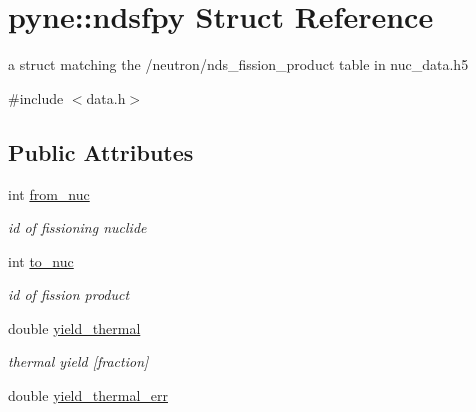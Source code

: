\hypertarget{structpyne_1_1ndsfpy}{}\section{pyne\+:\+:ndsfpy Struct Reference}
\label{structpyne_1_1ndsfpy}


a struct matching the \textquotesingle{}/neutron/nds\+\_\+fission\+\_\+product\textquotesingle{} table in nuc\+\_\+data.\+h5  




{\ttfamily \#include $<$data.\+h$>$}

\subsection*{Public Attributes}
\begin{DoxyCompactItemize}
\item 
\mbox{\label{structpyne_1_1ndsfpy_ad2cb8c35a387624f95c5318f259834db}} 
int \hyperlink{structpyne_1_1ndsfpy_ad2cb8c35a387624f95c5318f259834db}{from\+\_\+nuc}
\begin{DoxyCompactList}\small\item\em id of fissioning nuclide \end{DoxyCompactList}\item 
\mbox{\label{structpyne_1_1ndsfpy_aeabd96ca1b30be7381853ca0ccd75f31}} 
int \hyperlink{structpyne_1_1ndsfpy_aeabd96ca1b30be7381853ca0ccd75f31}{to\+\_\+nuc}
\begin{DoxyCompactList}\small\item\em id of fission product \end{DoxyCompactList}\item 
\mbox{\label{structpyne_1_1ndsfpy_a802ebba1436e6e7ca9595e77698310e8}} 
double \hyperlink{structpyne_1_1ndsfpy_a802ebba1436e6e7ca9595e77698310e8}{yield\+\_\+thermal}
\begin{DoxyCompactList}\small\item\em thermal yield \mbox{[}fraction\mbox{]} \end{DoxyCompactList}\item 
\mbox{\label{structpyne_1_1ndsfpy_affaf73e5d64d7e9e94f63c6807b7b17e}} 
double \hyperlink{structpyne_1_1ndsfpy_affaf73e5d64d7e9e94f63c6807b7b17e}{yield\+\_\+thermal\+\_\+err}

\end{DoxyCompactItemize}
